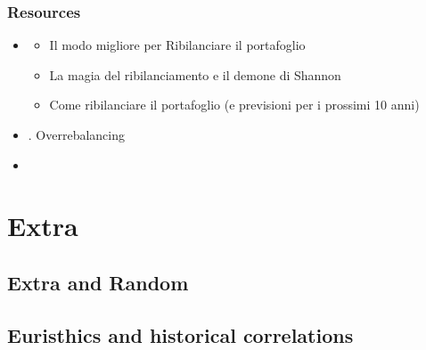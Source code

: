 \documentclass[letterpaper,10pt,english]{jupyterBook}
\begin{document}
\section{Resources}
\label{\detokenize{ch/investing/rebalancing:resources}}\begin{itemize}
\item {} 
\sphinxAtStartPar
{\hyperref[\detokenize{ch/people/the_bull_guests:fin-edu-resources-the-bull}]{}}
\begin{itemize}
\item {} 
\sphinxAtStartPar
{} Il modo migliore per Ribilanciare il portafoglio

\item {} 
\sphinxAtStartPar
{} La magia del ribilanciamento e il demone di Shannon

\item {} 
\sphinxAtStartPar
{} Come ribilanciare il portafoglio (e previsioni per i prossimi 10 anni)

\end{itemize}

\item {} 
\sphinxAtStartPar
{\hyperref[\detokenize{ch/people/list:fin-edu-resources-people-arnott}]{}}. Over\sphinxhyphen{}rebalancing

\item {} 
\sphinxAtStartPar
{}

\end{itemize}

\sphinxstepscope


\part{Extra}

\sphinxstepscope


\chapter{Extra and Random}
\label{\detokenize{ch/extra/intro:extra-and-random}}\label{\detokenize{ch/extra/intro:fin-edu-extra-intro}}\label{\detokenize{ch/extra/intro::doc}}
\sphinxstepscope


\chapter{Euristhics and historical correlations}
\label{\detokenize{ch/extra/euristhics:euristhics-and-historical-correlations}}\label{\detokenize{ch/extra/euristhics:fin-edu-extra-euristhics}}\label{\detokenize{ch/extra/euristhics::doc}}
\end{document}
